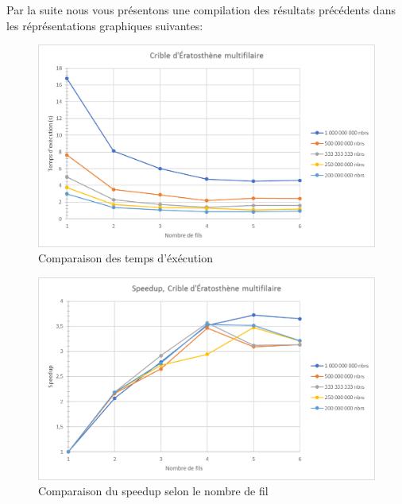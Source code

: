\documentclass{report}
\begin{document}
Par la suite nous vous présentons une compilation des résultats précédents dans les réprésentations graphiques
suivantes:
\begin{center}
	\begin{figure}[H]
		\includegraphics[scale=0.7]{Images/Graph_temps_exec.png}
		\caption{Comparaison des temps d'éxécution}
	\end{figure}
\end{center}

\begin{center}
	\begin{figure}[H]
		\includegraphics[scale=0.7]{Images/Graph_speedup.png}
		\caption{Comparaison du speedup selon le nombre de fil}
	\end{figure}
\end{center}
\end{document}
